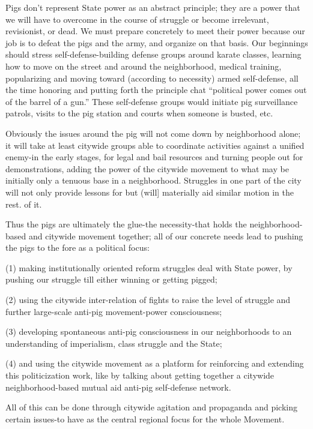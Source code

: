 \documentclass[12pt, titlepage]{article}
\begin{document}
{\begin{spacing}{1.10}
Pigs don't represent State power as an abstract principle; they are a power that we will have to overcome in the course of struggle or become irrelevant, revisionist, or dead. We must prepare concretely to meet their power because our job is to defeat the pigs and the army, and organize on that basis. Our beginnings should stress self-defense-building defense groups around karate classes, learning how to move on the street and around the neighborhood, medical training, popularizing and moving toward (according to necessity) armed self-defense, all the time honoring and putting forth the principle chat ``political power comes out of the barrel of a gun.'' These self-defense groups would initiate pig surveillance patrols, visits to the pig station and courts when someone is busted, etc.

Obviously the issues around the pig will not come down by neighborhood alone; it will take at least citywide groups able to coordinate activities against a unified enemy-in the early stages, for legal and bail resources and turning people out for demonstrations, adding the power of the citywide movement to what may be initially only a tenuous base in a neighborhood. Struggles in one part of the city will not only provide lessons for but (will] materially aid similar motion in the rest. of it.

Thus the pigs are ultimately the glue-the necessity-that holds the neighborhood-based and citywide movement together; all of our concrete needs lead to pushing the pigs to the fore as a political focus:

(1) making institutionally oriented reform struggles deal with State power, by pushing our struggle till either winning or getting pigged;

(2) using the citywide inter-relation of fights to raise the level of struggle and further large-scale anti-pig movement-power consciousness;

(3) developing spontaneous anti-pig consciousness in our neighborhoods to an understanding of imperialism, class struggle and the State;

(4) and using the citywide movement as a platform for reinforcing and extending this politicization work, like by talking about getting together a citywide neighborhood-based mutual aid anti-pig self-defense network.

All of this can be done through citywide agitation and propaganda and picking certain issues-to have as the central regional focus for the whole Movement.


\end{spacing}}
\end{document}
